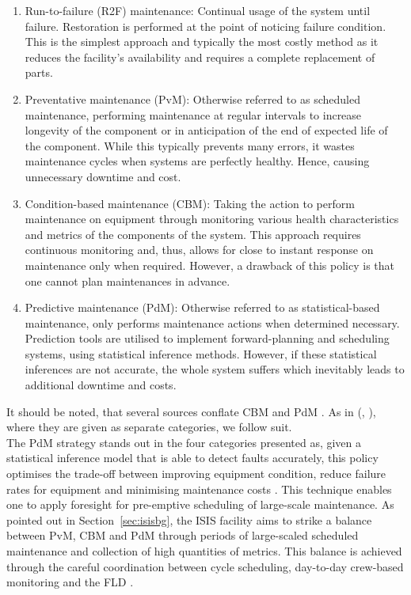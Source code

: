 \documentclass[10pt,oneside]{report}
\renewcommand{\citet}[1]{\citeauthor{#1}, \citeyear{#1}}
\begin{document}
\begin{enumerate}
    \item{Run-to-failure (R2F) maintenance: Continual usage of the system until failure. Restoration is performed at the point of noticing failure condition. This is the simplest approach and typically the most costly method as it reduces the facility's availability and requires a complete replacement of parts.} 
    \item{Preventative maintenance (PvM): Otherwise referred to as scheduled maintenance, performing maintenance at regular intervals to increase longevity of the component or in anticipation of the end of expected life of the component. While this typically prevents many errors, it wastes maintenance cycles when systems are perfectly healthy. Hence, causing unnecessary downtime and cost.}
    \item{Condition-based maintenance (CBM): Taking the action to perform maintenance on equipment through monitoring various health characteristics and metrics of the components of the system. This approach requires continuous monitoring and, thus, allows for close to instant response on maintenance only when required. However, a drawback of this policy is that one cannot plan maintenances in advance.}
    \item{Predictive maintenance (PdM): Otherwise referred to as statistical-based maintenance, only performs maintenance actions when determined necessary. Prediction tools are utilised to implement forward-planning and scheduling systems, using statistical inference methods. However, if these statistical inferences are not accurate, the whole system suffers which inevitably leads to additional downtime and costs.}
\end{enumerate}
It should be noted, that several sources conflate CBM and PdM \cite{mobley2002introduction}. As in (\citet{susto2012predictive}), where they are given as separate categories, we follow suit. \\ 

The PdM strategy stands out in the four categories presented as, given a statistical inference model that is able to detect faults accurately, this policy optimises the trade-off between improving equipment condition, reduce failure rates for equipment and minimising maintenance costs \cite{carvalho2019systematic}. This technique enables one to apply foresight for pre-emptive scheduling of large-scale maintenance. As pointed out in Section~\ref{sec:isisbg}, the ISIS facility aims to strike a balance between PvM, CBM and PdM through periods of large-scaled scheduled maintenance and collection of high quantities of metrics. This balance is achieved through the careful coordination between cycle scheduling, day-to-day crew-based monitoring and the FLD \cite{thomason2019isis}.
\end{document}
